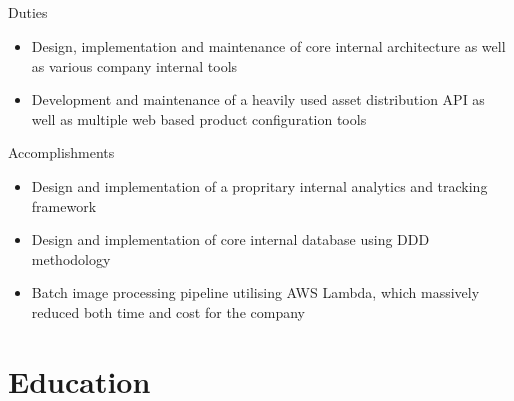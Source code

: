 \documentclass{resume}
\begin{document}
\bigskip
{} \\
 \\
 \\
 \\
Duties \\
\begin{itemize}
  \item Design, implementation and maintenance of core internal architecture as well as various company internal tools
  \item Development and maintenance of a heavily used asset distribution API as well as multiple web based product configuration tools
\end{itemize}
Accomplishments \\
\begin{itemize}
  \item Design and implementation of a propritary internal analytics and tracking framework
  \item Design and implementation of core internal database using DDD methodology 
  \item Batch image processing pipeline utilising AWS Lambda, which massively reduced both time and cost for the company
\end{itemize}

\section{{\faGraduationCap} Education}
 \\
 \\
\bigskip
{} \\
 \\
\end{document}
